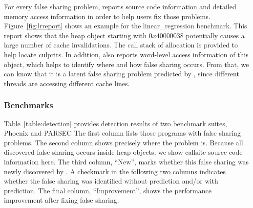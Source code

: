 For every false sharing problem, \Predator{} reports source code information and detailed memory access information in order to help users fix those problems. Figure~\ref{fig:lrreport} shows an example for the linear\_regression benchmark. This report shows that the heap object starting with $0x40000038$ potentially causes a large number of cache invalidations. The call stack of allocation is provided to help locate culprits. In addition, \Predator{} also reports word-level access information of this object, which helps to identify where and how false sharing occurs. From that, we can know that it is a latent false sharing problem predicted by \Predator{}, since different threads are accessing different cache lines. 

\subsubsection{Benchmarks}
\label{sec:benchmarks}

\begin{table}[!t]
{\centering
{}
\caption{False sharing problems in the Phoenix and PARSEC benchmark suites. \label{table:detection}}
}
\end{table}

Table~\ref{table:detection} provides detection results of two benchmark suites, Phoenix and PARSEC
The first column lists those programs with false sharing problems.  The second column shows precisely where the problem is. Because all discovered false sharing occurs inside heap objects, we show callsite source code information here.  The third column, ``New'', marks whether this false sharing was newly discovered by \Predator{}.  A checkmark in the following two columns indicates whether the false sharing was identified without
prediction and/or with prediction.  The final column, ``Improvement'', shows the performance improvement after fixing false sharing.

